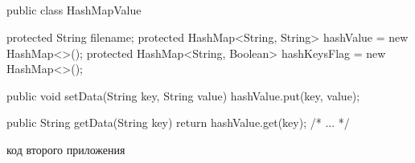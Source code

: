 \documentclass[a4paper,12pt]{article}
\begin{document}
\begin{appendices}
\renewcommand{\thesection}{\Asbuk{section}}
\makeatletter
\renewcommand{\theProgram}{\thesection.\@arabic\c@Program}
\makeatother

\section{\centering } 
\setcounter{Program}{0}

\begin{flushleft}
\label{app1}
\begin{MyCodes}
public class HashMapValue {
	
	protected String filename; 
	protected HashMap<String, String> hashValue = 
	new HashMap<>();
	protected HashMap<String, Boolean> hashKeysFlag =
	 new HashMap<>();
	
	public void setData(String key, String value) {
		hashValue.put(key, value);
	}
	
	public String getData(String key) {
		return hashValue.get(key);
	}
    /* ... */
}
\end{MyCodes}
\end{flushleft}

\pagebreak

\begin{flushleft}
\label{app2}
\begin{MyCodes}
код второго приложения
\end{MyCodes}

\end{flushleft}

\end{appendices}
\end{document}
